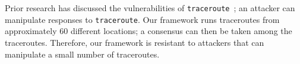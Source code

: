 Prior research has discussed the vulnerabilities of {\tt traceroute}~\cite{padmanabhan2003secure}; an attacker can manipulate responses to {\tt traceroute}.  Our framework runs traceroutes from approximately 60 different locations; a consensus can then be taken among the traceroutes.  Therefore, our framework is resistant to attackers that can manipulate a small number of traceroutes.  


